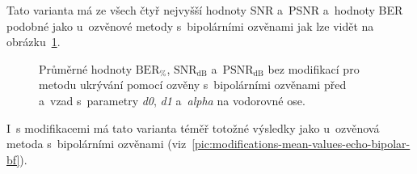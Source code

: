 Tato varianta má ze všech čtyř nejvyšší hodnoty SNR a~PSNR a~hodnoty BER
podobné jako u~ozvěnové metody s~bipolárními ozvěnami jak lze vidět na
obrázku~\ref{pic:no-mod-params-mean-values-echo-bipolar-bf}.

\begin{figure}[H]
    \table
    \centering
    \caption{Průměrné hodnoty $\mathrm{BER}_{\%}$, $\mathrm{SNR}_\mathrm{dB}$
    a~$\mathrm{PSNR}_\mathrm{dB}$ bez modifikací pro metodu ukrývání pomocí
    ozvěny s~bipolárními ozvěnami před a~vzad s~parametry \textit{d0},
    \textit{d1} a~\textit{alpha} na vodorovné ose.}
    \label{pic:no-mod-params-mean-values-echo-bipolar-bf}
\end{figure}

I~s modifikacemi má tato varianta téměř totožné výsledky jako u~ozvěnová metoda
s~bipolárními ozvěnami
(viz~\ref{pic:modifications-mean-values-echo-bipolar-bf}).

